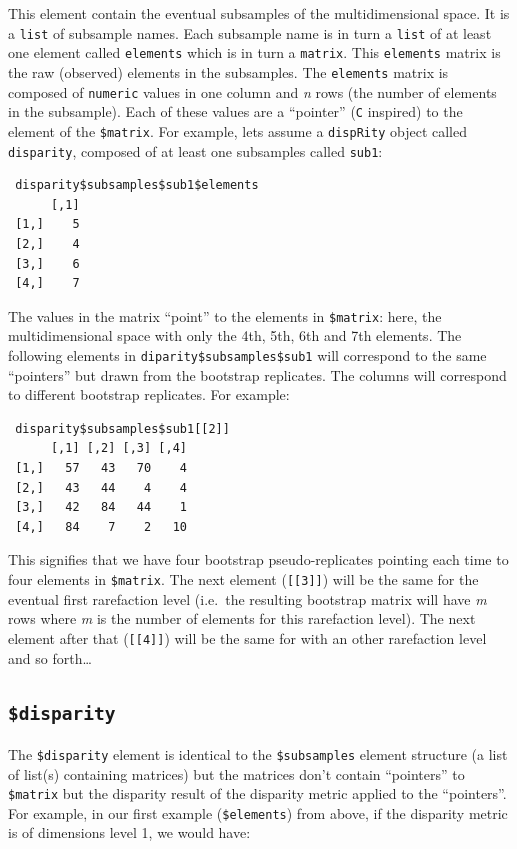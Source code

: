 \documentclass[]{book}
\theoremstyle{definition}
\theoremstyle{definition}
\theoremstyle{remark}
\begin{document}
This element contain the eventual subsamples of the multidimensional
space. It is a \texttt{list} of subsample names. Each subsample name is
in turn a \texttt{list} of at least one element called \texttt{elements}
which is in turn a \texttt{matrix}. This \texttt{elements} matrix is the
raw (observed) elements in the subsamples. The \texttt{elements} matrix
is composed of \texttt{numeric} values in one column and \emph{n} rows
(the number of elements in the subsample). Each of these values are a
``pointer'' (\texttt{C} inspired) to the element of the
\texttt{\$matrix}. For example, lets assume a \texttt{dispRity} object
called \texttt{disparity}, composed of at least one subsamples called
\texttt{sub1}:

\begin{verbatim}
 disparity$subsamples$sub1$elements
      [,1]
 [1,]    5
 [2,]    4
 [3,]    6
 [4,]    7
\end{verbatim}

The values in the matrix ``point'' to the elements in \texttt{\$matrix}:
here, the multidimensional space with only the 4th, 5th, 6th and 7th
elements. The following elements in \texttt{diparity\$subsamples\$sub1}
will correspond to the same ``pointers'' but drawn from the bootstrap
replicates. The columns will correspond to different bootstrap
replicates. For example:

\begin{verbatim}
 disparity$subsamples$sub1[[2]]
      [,1] [,2] [,3] [,4]
 [1,]   57   43   70    4
 [2,]   43   44    4    4
 [3,]   42   84   44    1
 [4,]   84    7    2   10
\end{verbatim}

This signifies that we have four bootstrap pseudo-replicates pointing
each time to four elements in \texttt{\$matrix}. The next element
(\texttt{{[}{[}3{]}{]}}) will be the same for the eventual first
rarefaction level (i.e.~the resulting bootstrap matrix will have
\emph{m} rows where \emph{m} is the number of elements for this
rarefaction level). The next element after that (\texttt{{[}{[}4{]}{]}})
will be the same for with an other rarefaction level and so
forth\ldots{}

\subsection{\texorpdfstring{\texttt{\$disparity}}{\$disparity}}\label{disparity}

The \texttt{\$disparity} element is identical to the
\texttt{\$subsamples} element structure (a list of list(s) containing
matrices) but the matrices don't contain ``pointers'' to
\texttt{\$matrix} but the disparity result of the disparity metric
applied to the ``pointers''. For example, in our first example
(\texttt{\$elements}) from above, if the disparity metric is of
dimensions level 1, we would have:
\end{document}
